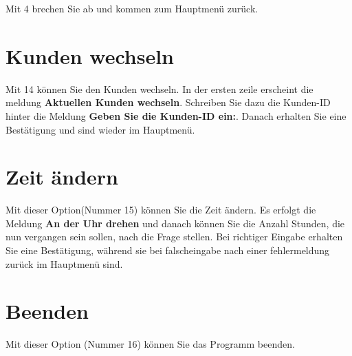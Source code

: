 ﻿\documentclass[a4paper,12pt,titlepage]{article}
\newcommand\enquote[1]{{\ttfamily \bfseries #1}}
\begin{document}
Mit 4 brechen Sie ab und kommen zum Hauptmenü zurück.

\section{Kunden wechseln}
Mit 14 können Sie den Kunden wechseln.
In der ersten zeile erscheint die meldung \enquote{Aktuellen Kunden wechseln}.
Schreiben Sie dazu die Kunden-ID hinter die Meldung \enquote{Geben Sie die Kunden-ID ein:}.
Danach erhalten Sie eine Bestätigung und sind wieder im Hauptmenü.

\section{Zeit ändern}
Mit dieser Option(Nummer 15) können Sie die Zeit ändern.
Es erfolgt die Meldung \enquote{An der Uhr drehen} und danach können Sie die Anzahl Stunden,
 die nun vergangen sein sollen, nach die Frage stellen.
Bei richtiger Eingabe erhalten Sie eine Bestätigung,
 während sie bei falscheingabe nach einer fehlermeldung zurück im Hauptmenü sind.

\section{Beenden}
Mit dieser Option (Nummer 16) können Sie das Programm beenden.
 
\end{document}
